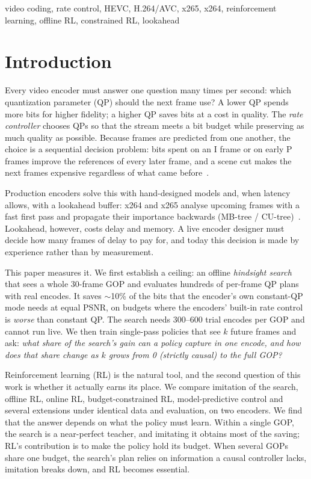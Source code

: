 \documentclass[conference]{IEEEtran}
\begin{document}
\begin{IEEEkeywords}
video coding, rate control, HEVC, H.264/AVC, x265, x264, reinforcement learning, offline RL, constrained RL, lookahead
\end{IEEEkeywords}

\section{Introduction}
Every video encoder must answer one question many times per second: which quantization parameter (QP) should the next frame use? A lower QP spends more bits for higher fidelity; a higher QP saves bits at a cost in quality. The \emph{rate controller} chooses QPs so that the stream meets a bit budget while preserving as much quality as possible. Because frames are predicted from one another, the choice is a sequential decision problem: bits spent on an I frame or on early P frames improve the references of every later frame, and a scene cut makes the next frames expensive regardless of what came before~\cite{sullivan1998rdo,ortega1998rd}.

Production encoders solve this with hand-designed models and, when latency allows, with a lookahead buffer: x264 and x265 analyse upcoming frames with a fast first pass and propagate their importance backwards (MB-tree / CU-tree)~\cite{garrett2009mbtree,x264,x265}. Lookahead, however, costs delay and memory. A live encoder designer must decide how many frames of delay to pay for, and today this decision is made by experience rather than by measurement.

This paper measures it. We first establish a ceiling: an offline \emph{hindsight search} that sees a whole 30-frame GOP and evaluates hundreds of per-frame QP plans with real encodes. It saves $\sim$10\% of the bits that the encoder's own constant-QP mode needs at equal PSNR, on budgets where the encoders' built-in rate control is \emph{worse} than constant QP. The search needs 300--600 trial encodes per GOP and cannot run live. We then train single-pass policies that see $k$ future frames and ask: \emph{what share of the search's gain can a policy capture in one encode, and how does that share change as $k$ grows from 0 (strictly causal) to the full GOP?}

Reinforcement learning (RL) is the natural tool, and the second question of this work is whether it actually earns its place. We compare imitation of the search, offline RL, online RL, budget-constrained RL, model-predictive control and several extensions under identical data and evaluation, on two encoders. We find that the answer depends on what the policy must learn. Within a single GOP, the search is a near-perfect teacher, and imitating it obtains most of the saving; RL's contribution is to make the policy hold its budget. When several GOPs share one budget, the search's plan relies on information a causal controller lacks, imitation breaks down, and RL becomes essential.
\end{document}
